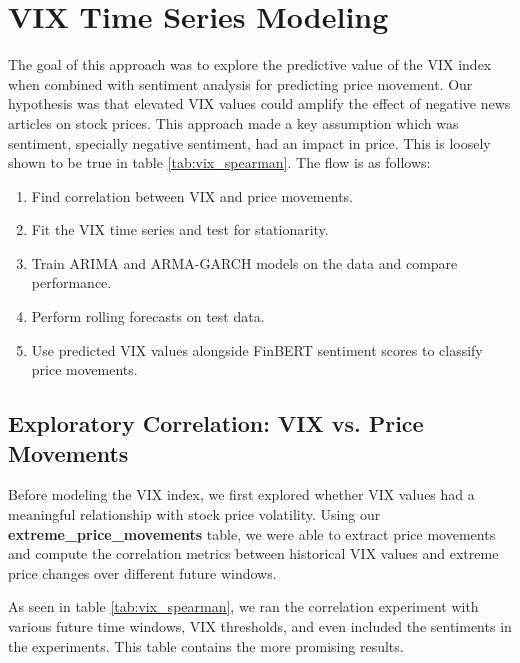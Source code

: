 \documentclass[twocolumn]{article}
\begin{document}
\section{VIX Time Series Modeling}

The goal of this approach was to explore the predictive value of the VIX index when combined with sentiment analysis for predicting price movement. Our hypothesis was that elevated VIX values could amplify the effect of negative news articles on stock prices. This approach made a key assumption which was sentiment, specially negative sentiment, had an impact in price. This is loosely shown to be true in table \ref{tab:vix_spearman}. The flow is as follows:

\begin{enumerate}
    \item Find correlation between VIX and price movements.
    \item Fit the VIX time series and test for stationarity.
    \item Train ARIMA and ARMA-GARCH models on the data and compare performance.
    \item Perform rolling forecasts on test data.
    \item Use predicted VIX values alongside FinBERT sentiment scores to classify price movements.
\end{enumerate}

\subsection{Exploratory Correlation: VIX vs. Price Movements}

Before modeling the VIX index, we first explored whether VIX values had a meaningful relationship with stock price volatility. Using our \textbf{extreme\_price\_movements} table, we were able to extract price movements and compute the correlation metrics between historical VIX values and extreme price changes over different future windows.

As seen in table \ref{tab:vix_spearman}, we ran the correlation experiment with various future time windows, VIX thresholds, and even included the sentiments in the experiments. This table contains the more promising results.
\end{document}

